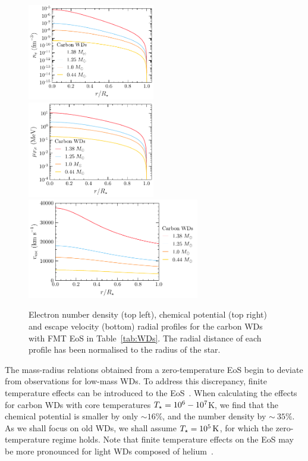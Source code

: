 \begin{figure}[!t]
    \centering
    \includegraphics[width = 0.495\textwidth]{ne_prof.pdf}  
    \includegraphics[width = 0.495\textwidth]{muFe_prof.pdf}  
    \includegraphics[width = 0.67\textwidth]{vesc_prof.pdf}
    \caption{Electron number density (top left), chemical potential (top right) and escape velocity (bottom) radial profiles for the carbon WDs with FMT EoS in Table~\ref{tab:WDs}. The radial distance of each profile has been normalised to the radius of the star.}
    \label{fig:WDradprofs}
\end{figure}

The mass-radius relations obtained from a zero-temperature EoS begin to deviate from observations for low-mass WDs. To address this discrepancy, finite temperature effects can be introduced to the EoS~\cite{deCarvalho:2013rea_Relativisticfeynmanmetropolistellertreatment}. When calculating the effects for carbon WDs with core temperatures $T_\star=10^6-10^7   $K, we find that the chemical potential is smaller by only $\sim16\%$, and the number density by $\sim~35\%$.
As we shall focus on old WDs, we shall assume $T_\star=10^5{\rm \,K}$, for which the zero-temperature regime holds. Note that finite temperature effects on the EoS may be more pronounced for light WDs composed of helium~\cite{deCarvalho:2013rea_Relativisticfeynmanmetropolistellertreatment}. 

